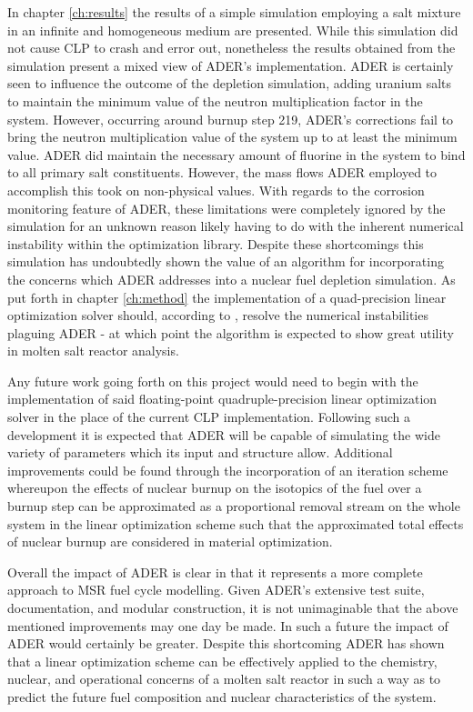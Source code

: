 In chapter \ref{ch:results} the results of a simple simulation employing a 
 salt mixture in an infinite and homogeneous medium are
presented. While this simulation did not cause CLP to crash and error out,
nonetheless the results obtained from the simulation present a mixed view of
ADER's implementation. ADER is certainly seen to influence the outcome of the
depletion simulation, adding uranium salts to maintain the minimum value of the
neutron multiplication factor in the system. However, occurring around burnup
step 219, ADER's corrections fail to bring the neutron multiplication value
of the system up to at least the minimum value. ADER did maintain the necessary
amount of fluorine in the system to bind to all primary salt constituents.
However, the mass flows ADER employed to accomplish this took on non-physical
values. With regards to the corrosion monitoring feature of ADER, these
limitations were completely ignored by the simulation for an unknown reason
likely having to do with the inherent numerical instability within the
optimization library. Despite these shortcomings this simulation has undoubtedly
shown the value of an algorithm for incorporating the concerns which ADER
addresses into a nuclear fuel depletion simulation. As put forth in chapter
\ref{ch:method} the implementation of a quad-precision linear optimization solver
should, according to \cite{STANFORD}, resolve the numerical instabilities
plaguing ADER - at which point the algorithm is expected to show great utility
in molten salt reactor analysis.

Any future
work going forth on this project would need to begin with the implementation
of said floating-point quadruple-precision linear optimization solver in the 
place
of the current CLP implementation. Following such a development it is expected
that ADER will be capable of simulating the wide variety of parameters which its
input and structure allow. Additional improvements could be found through the
incorporation of an iteration scheme whereupon the effects of nuclear burnup
on the isotopics of the fuel over a burnup step can be approximated as a
proportional removal stream on the whole system in the linear optimization
scheme such that the approximated total effects of nuclear burnup are considered
in material optimization. 

Overall the impact of ADER is clear in that it represents a more complete
approach to MSR fuel cycle modelling.
Given ADER's extensive test suite, documentation, and modular construction, it
is not unimaginable that the above mentioned improvements may one day be made.
In such a future the impact of ADER would certainly be greater.
Despite this shortcoming ADER has shown that a linear optimization scheme can
be effectively applied to the chemistry, nuclear, and operational concerns of a
molten salt reactor in such a way as to predict the future fuel composition and 
nuclear characteristics of the system.
